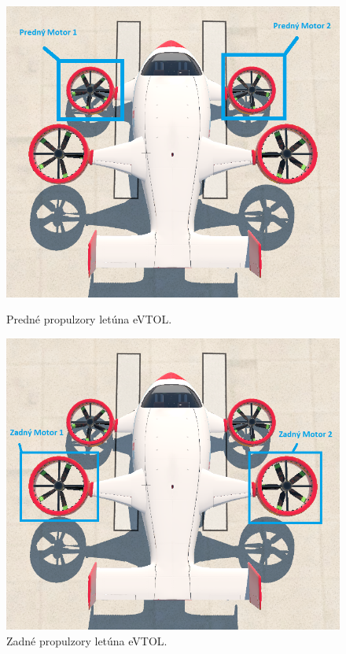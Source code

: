 \begin{figure}[h]
 \begin{minipage}{.48\textwidth}
  \centering
  \includegraphics[scale=0.32]{obrazky-figures/motoryP.png}
  \caption{Predné propulzory letúna eVTOL.}\label{prednyMotor}
  \end{minipage}%
  \hfill
  \begin{minipage}{.48\textwidth}
  \centering
  \includegraphics[scale=0.32]{obrazky-figures/motoryZ.png}
  \caption{Zadné propulzory letúna eVTOL.}\label{zadnyMotor}
  \end{minipage}%
\end{figure}
\newpage

